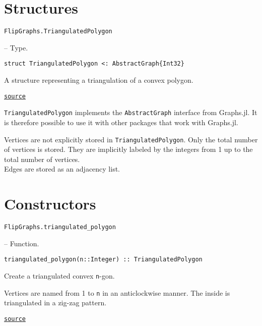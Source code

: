 \section{Structures}



\label{15035490444877811912}{}

\hypertarget{6755725597592837229}{\texttt{FlipGraphs.TriangulatedPolygon}}  -- {Type.}

\begin{adjustwidth}{2em}{0pt}


\begin{verbatim}
struct TriangulatedPolygon <: AbstractGraph{Int32}
\end{verbatim}

A structure representing a triangulation of a convex polygon.



\href{https://github.com/schto223/FlipGraphs.jl/blob/e35d43698a06b86273148826b79d585ba04fcd26/src/polygonTriangulations.jl#L1-L5}{\texttt{source}}


\end{adjustwidth}

\texttt{TriangulatedPolygon} implements the \texttt{AbstractGraph} interface from Graphs.jl. It is therefore possible to use it with other packages that work with Graphs.jl.



Vertices are not explicitly stored in \texttt{TriangulatedPolygon}.  Only the total number of vertices is stored. They are implicitly labeled by the integers from 1 up to the total number of vertices.\\
Edges are stored as an adjacency list.



\section{Constructors}



\label{1468722345706912774}{}

\hypertarget{11161655937638359151}{\texttt{FlipGraphs.triangulated\_polygon}}  -- {Function.}

\begin{adjustwidth}{2em}{0pt}


\begin{verbatim}
triangulated_polygon(n::Integer) :: TriangulatedPolygon
\end{verbatim}

Create a triangulated convex \texttt{n}-gon. 

Vertices are named from 1 to \texttt{n} in an anticlockwise manner. The inside is triangulated in a zig-zag pattern.



\href{https://github.com/schto223/FlipGraphs.jl/blob/e35d43698a06b86273148826b79d585ba04fcd26/src/polygonTriangulations.jl#L27-L34}{\texttt{source}}


\end{adjustwidth}

